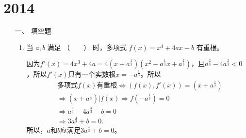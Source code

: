\section{2014}
\begin{enumerate}[1~]
\renewcommand{\labelenumi}{\textbf{\theenumi. }}
\renewcommand{\Im}{\text{Im }}
\item[一、]填空题 
\begin{enumerate}[1.~]
\item
当 $a, b$ 满足 （\ \ \ \ ） 时，多项式 $f(x) = x^4 + 4ax - b$ 有重根。
\begin{solution}
因为$f'(x)=4x^3+4a=4(x+a^{\frac{1}{3}})(x^2-a^{\frac{1}{3}}x+a^{\frac{2}{3}})$，且$a^{\frac{2}{3}}-4a^{\frac{2}{3}}<0$，所以$f'(x)$只有一个实数根$x=-a^{\frac{1}{3}}$。所以
\begin{align*}
&\text{多项式$f(x)$有重根}
\Leftrightarrow (f(x),f'(x))=(x+a^{\frac{1}{3}} )\\
&\Rightarrow (x+a^{\frac13})| f(x) \Rightarrow f(-a^{\frac13})=0\\ 
&\Rightarrow a^{\frac43}-4a^{\frac43}-b=0\\
&\Rightarrow 3a^{\frac43}+b=0.
\end{align*}
所以，$a$和$b$应满足$3a^{\frac 43}+b = 0$。
\end{solution}


\end{enumerate}
\end{enumerate}
